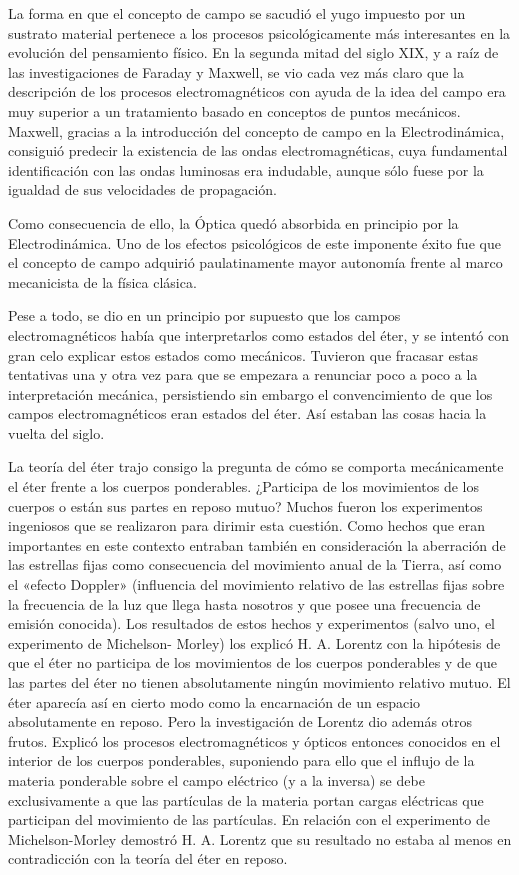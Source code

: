 \documentclass[spanish]{book}
\begin{document}
La forma en que el concepto de campo se sacudió el yugo impuesto por un sustrato
material pertenece a los procesos psicológicamente más interesantes en la evolución
del pensamiento físico. En la segunda mitad del siglo XIX, y a raíz de las investigaciones
de Faraday y Maxwell, se vio cada vez más claro que la descripción de los procesos
electromagnéticos con ayuda de la idea del campo era muy superior a un tratamiento
basado en conceptos de puntos mecánicos. Maxwell, gracias a la introducción del
concepto de campo en la Electrodinámica, consiguió predecir la existencia de las ondas
electromagnéticas, cuya fundamental identificación con las ondas luminosas era
indudable, aunque sólo fuese por la igualdad de sus velocidades de propagación.

Como consecuencia de ello, la Óptica quedó absorbida en principio por la
Electrodinámica. Uno de los efectos psicológicos de este imponente éxito fue que el
concepto de campo adquirió paulatinamente mayor autonomía frente al marco
mecanicista de la física clásica.

Pese a todo, se dio en un principio por supuesto que los campos electromagnéticos
había que interpretarlos como estados del éter, y se intentó con gran celo explicar estos
estados como mecánicos. Tuvieron que fracasar estas tentativas una y otra vez para que
se empezara a renunciar poco a poco a la interpretación mecánica, persistiendo sin
embargo el convencimiento de que los campos electromagnéticos eran estados del éter.
Así estaban las cosas hacia la vuelta del siglo.

La teoría del éter trajo consigo la pregunta de cómo se comporta mecánicamente el
éter frente a los cuerpos ponderables. ¿Participa de los movimientos de los cuerpos o
están sus partes en reposo mutuo? Muchos fueron los experimentos ingeniosos que se
realizaron para dirimir esta cuestión. Como hechos que eran importantes en este
contexto entraban también en consideración la aberración de las estrellas fijas como
consecuencia del movimiento anual de la Tierra, así como el «efecto Doppler»
(influencia del movimiento relativo de las estrellas fijas sobre la frecuencia de la luz
que llega hasta nosotros y que posee una frecuencia de emisión conocida). Los
resultados de estos hechos y experimentos (salvo uno, el experimento de Michelson-
Morley) los explicó H. A. Lorentz con la hipótesis de que el éter no participa de los
movimientos de los cuerpos ponderables y de que las partes del éter no tienen
absolutamente ningún movimiento relativo mutuo. El éter aparecía así en cierto modo
como la encarnación de un espacio absolutamente en reposo. Pero la investigación de
Lorentz dio además otros frutos. Explicó los procesos electromagnéticos y ópticos
entonces conocidos en el interior de los cuerpos ponderables, suponiendo para ello
que el influjo de la materia ponderable sobre el campo eléctrico (y a la inversa) se
debe exclusivamente a que las partículas de la materia portan cargas eléctricas que
participan del movimiento de las partículas. En relación con el experimento de
Michelson-Morley demostró H. A. Lorentz que su resultado no estaba al menos en
contradicción con la teoría del éter en reposo.
\end{document}
